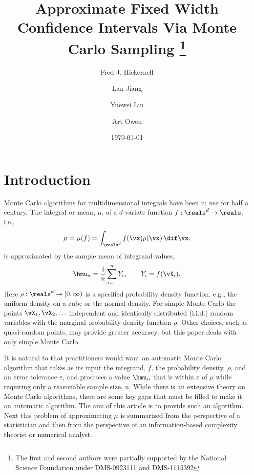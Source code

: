 \documentclass[graybox]{svmult}
\begin{document}
\date{\today}
\title*{Approximate Fixed Width Confidence Intervals Via Monte Carlo Sampling
\thanks{The first and second authors were partially supported by the National
Science Foundation under DMS-0923111 and DMS-1115392}}
\author{Fred J. Hickernell \and
Lan Jiang \and Yuewei Liu \and Art Owen }
%
%
\maketitle



\section{Introduction}

Monte Carlo algorithms for multidimensional integrals have been in use for half a century.  The integral or mean, $\mu$, of a $d$-variate function $f: \reals^d \to \reals$, i.e.,
\begin{equation*} 
\mu= \mu(f) = \int_{\reals^d} f(\vx) \rho(\vx) \, \dif \vx,
\end{equation*}
is approximated by the sample mean of integrand values,
\begin{equation} \label{samplemean}
\hmu_n = \frac 1n \sum_{i=1}^n Y_i, \qquad Y_i = f(\vX_i).
\end{equation}
Here $\rho: \reals^d \to [0,\infty)$ is a specified probability density function, e.g., the uniform density on a cube or the normal density.  For simple Monte Carlo the points $\vX_1, \vX_2, \ldots$ independent and identically distributed (i.i.d.) random variables with the marginal probability density function $\rho$.  Other choices, such as quasi-random points, may provide greater accuracy, but this paper deals with only simple Monte Carlo.

It is natural to that practitioners would want an automatic Monte Carlo algorithm that takes as its input the integrand, $f$, the probability density, $\rho$, and an error tolerance $\varepsilon$, and produces a value $\hmu_n$ that is within $\varepsilon$ of $\mu$ while requiring only a reasonable sample size, $n$.  While there is an extensive theory on Monte Carlo algorithms, there are some key gaps that must be filled to make it an automatic algorithm.  The aim of this article is to provide such an algorithm.  Next this problem of approximating $\mu$ is summarized from the perspective of a statistician and then from the perspective of an information-based complexity theorist or numerical analyst.
\end{document}
